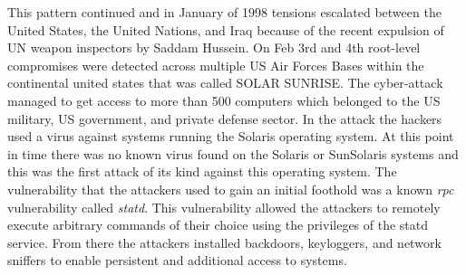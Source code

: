\documentclass[12pt]{report}
\begin{document}
This pattern continued and in January of 1998 tensions escalated between the United States, the United Nations, and Iraq because of the recent expulsion of UN weapon inspectors by Saddam Hussein.  On Feb 3rd and 4th root-level compromises were detected across multiple US Air Forces Bases within the continental united states that was called SOLAR SUNRISE.  The cyber-attack managed to get access to more than 500 computers which belonged to the US military, US government, and private defense sector.  In the attack the hackers used a virus against systems running the Solaris operating system.  At this point in time there was no known virus found on the Solaris or SunSolaris systems and this was the first attack of its kind against this operating system.  The vulnerability that the attackers used to gain an initial foothold was a known \emph{rpc} vulnerability called \emph{statd}.  This vulnerability allowed the attackers to remotely execute arbitrary commands of their choice using the privileges of the statd service.   From there the attackers installed backdoors, keyloggers, and network sniffers to enable persistent and additional access to systems.  
\end{document}
